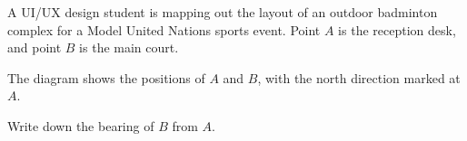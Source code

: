 \begin{question}
\noindent A UI/UX design student is mapping out the layout of an outdoor badminton complex for a Model United Nations sports event. Point $A$ is the reception desk, and point $B$ is the main court.

\noindent The diagram shows the positions of $A$ and $B$, with the north direction marked at $A$.

\begin{center}
\end{center}

\noindent Write down the bearing of $B$ from $A$.

\vspace{4cm}

\begin{flushright}
\end{flushright}
\end{question}
